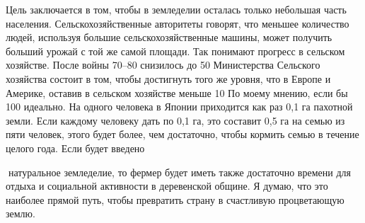 \documentclass[a4paper]{book}
\begin{document}
Цель заключается в том, чтобы в земледелии осталась только небольшая часть
населения. Сельскохозяйственные авторитеты говорят, что меньшее количество людей,
используя большие сельскохозяйственные машины, может получить больший урожай с той
же самой площади. Так понимают прогресс в сельском хозяйстве.
После войны 70–80 %
снизилось до 50 %
Министерства Сельского хозяйства состоит в том, чтобы достигнуть того же уровня, что в
Европе и Америке, оставив в сельском хозяйстве меньше 10 %
По моему мнению, если бы 100 %
идеально. На одного человека в Японии приходится как раз 0,1 га пахотной земли. Если
каждому человеку дать по 0,1 га, это составит 0,5 га на семью из пяти человек, этого будет
более, чем достаточно, чтобы кормить семью в течение целого года. Если будет введено

натуральное земледелие, то фермер будет иметь также достаточно времени для отдыха и
социальной активности в деревенской общине. Я думаю, что это наиболее прямой путь,
чтобы превратить страну в счастливую процветающую землю.
\end{document}
